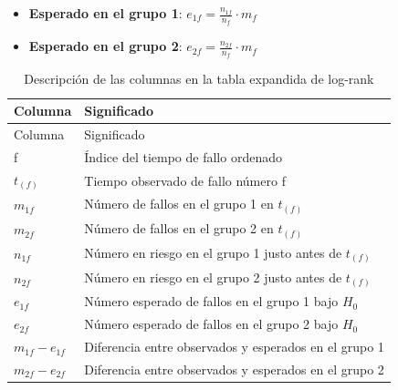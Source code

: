 \documentclass[
]{article}
\begin{document}
\begin{itemize}
\item
  \textbf{Esperado en el grupo 1}:
  \(e_{1f} = \frac{n_{1f}}{n_f} \cdot m_f\)
\item
  \textbf{Esperado en el grupo 2}:
  \(e_{2f} = \frac{n_{2f}}{n_f} \cdot m_f\)
\end{itemize}

\begin{tcolorbox}[enhanced jigsaw, arc=.35mm, coltitle=black, opacitybacktitle=0.6, colbacktitle=quarto-callout-note-color!10!white, breakable, toprule=.15mm, titlerule=0mm, colframe=quarto-callout-note-color-frame, colback=white, bottomrule=.15mm, leftrule=.75mm, rightrule=.15mm, bottomtitle=1mm, toptitle=1mm, opacityback=0, left=2mm, title=\textcolor{quarto-callout-note-color}{\faInfo}\hspace{0.5em}{Significado de las columnas de la tabla expandida}]

\begin{longtable}[]{@{}
  >{\raggedright\arraybackslash}p{}
  >{\raggedright\arraybackslash}p{}@{}}
\caption{Descripción de las columnas en la tabla expandida de
log-rank}\tabularnewline
\toprule\noalign{}
\begin{minipage}[b]{\linewidth}\raggedright
Columna
\end{minipage} & \begin{minipage}[b]{\linewidth}\raggedright
Significado
\end{minipage} \\
\midrule\noalign{}
\endfirsthead
\toprule\noalign{}
\begin{minipage}[b]{\linewidth}\raggedright
Columna
\end{minipage} & \begin{minipage}[b]{\linewidth}\raggedright
Significado
\end{minipage} \\
\midrule\noalign{}
\endhead
\bottomrule\noalign{}
\endlastfoot
f & Índice del tiempo de fallo ordenado \\
\(t_{(f)}\) & Tiempo observado de fallo número f \\
\(m_{1f}\) & Número de fallos en el grupo 1 en \(t_{(f)}\) \\
\(m_{2f}\) & Número de fallos en el grupo 2 en \(t_{(f)}\) \\
\(n_{1f}\) & Número en riesgo en el grupo 1 justo antes de
\(t_{(f)}\) \\
\(n_{2f}\) & Número en riesgo en el grupo 2 justo antes de
\(t_{(f)}\) \\
\(e_{1f}\) & Número esperado de fallos en el grupo 1 bajo \(H_0\) \\
\(e_{2f}\) & Número esperado de fallos en el grupo 2 bajo \(H_0\) \\
\(m_{1f} - e_{1f}\) & Diferencia entre observados y esperados en el
grupo 1 \\
\(m_{2f} - e_{2f}\) & Diferencia entre observados y esperados en el
grupo 2 \\
\end{longtable}

\end{tcolorbox}
\end{document}

